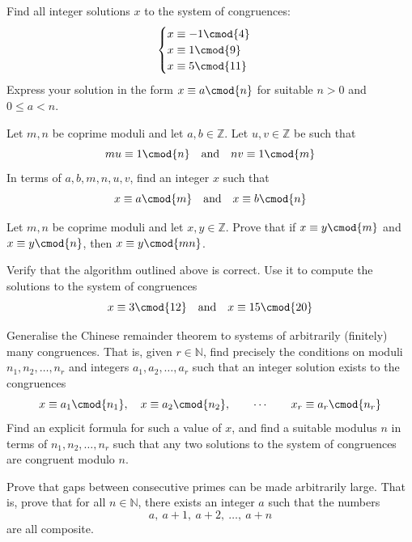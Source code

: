 \begin{exercise}
Find all integer solutions $x$ to the system of congruences:
\[ \begin{cases}
x \equiv {-1} \cmod{4} \\
x \equiv 1 \cmod{9} \\
x \equiv 5 \cmod{11}
\end{cases} \]
Express your solution in the form $x \equiv a \cmod{n}$ for suitable $n > 0$ and $0 \le a < n$.
\end{exercise}

\begin{exercise}
\label{exCRTExistence}
Let $m,n$ be coprime moduli and let $a,b \in \mathbb{Z}$. Let $u,v \in \mathbb{Z}$ be such that
\[ mu \equiv 1 \cmod{n} \quad \text{and} \quad nv \equiv 1 \cmod{m} \]
In terms of $a,b,m,n,u,v$, find an integer $x$ such that
\[ x \equiv a \cmod{m} \quad \text{and} \quad x \equiv b \cmod{n} \]
\end{exercise}

\begin{exercise}
\label{exCRTUniqueness}
Let $m,n$ be coprime moduli and let $x,y \in \mathbb{Z}$. Prove that if $x \equiv y \cmod{m}$ and $x \equiv y \cmod{n}$, then $x \equiv y \cmod{mn}$.
\end{exercise}


\begin{exercise}
\label{exCRTAlgorithm}
Verify that the algorithm outlined above is correct. Use it to compute the solutions to the system of congruences
\[ x \equiv 3 \cmod{12} \quad \text{and} \quad x \equiv 15 \cmod{20} \]
\end{exercise}

\begin{oexercise}
\label{exGeneralisedCRT}
Generalise the Chinese remainder theorem to systems of arbitrarily (finitely) many congruences. That is, given $r \in \mathbb{N}$, find precisely the conditions on moduli $n_1,n_2,\dots,n_r$ and integers $a_1,a_2,\dots,a_r$ such that an integer solution exists to the congruences
\[ x \equiv a_1 \cmod{n_1}, \quad x \equiv a_2 \cmod{n_2}, \qquad \cdots \qquad x_r \equiv a_r \cmod{n_r} \]
Find an explicit formula for such a value of $x$, and find a suitable modulus $n$ in terms of $n_1,n_2,\dots,n_r$ such that any two solutions to the system of congruences are congruent modulo $n$.
\end{oexercise}

\begin{exercise}
\label{exGapsBetweenPrimesLarge}
Prove that gaps between consecutive primes can be made arbitrarily large. That is, prove that for all $n \in \mathbb{N}$, there exists an integer $a$ such that the numbers
\[ a,\ a+1,\ a+2,\ \dots,\ a+n \]
are all composite.
\end{exercise}


